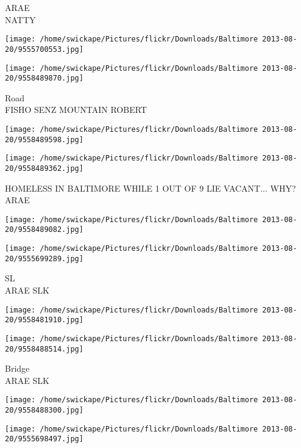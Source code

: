 \documentclass[10pt,letterpaper]{article}
\begin{document}
ARAE\\
NATTY\\
\pagebreak

\texttt{[image: /home/swickape/Pictures/flickr/Downloads/Baltimore 2013-08-20/9555700553.jpg]}

\vspace{0.25in}
\texttt{[image: /home/swickape/Pictures/flickr/Downloads/Baltimore 2013-08-20/9558489870.jpg]}

Road\\
FISHO SENZ MOUNTAIN ROBERT\\
\pagebreak

\texttt{[image: /home/swickape/Pictures/flickr/Downloads/Baltimore 2013-08-20/9558489598.jpg]}

\vspace{0.25in}
\texttt{[image: /home/swickape/Pictures/flickr/Downloads/Baltimore 2013-08-20/9558489362.jpg]}

HOMELESS IN BALTIMORE WHILE 1 OUT OF 9 LIE VACANT... WHY?\\
ARAE\\
\pagebreak

\texttt{[image: /home/swickape/Pictures/flickr/Downloads/Baltimore 2013-08-20/9558489082.jpg]}

\vspace{0.25in}
\texttt{[image: /home/swickape/Pictures/flickr/Downloads/Baltimore 2013-08-20/9555699289.jpg]}

SL\\
ARAE SLK\\
\pagebreak

\texttt{[image: /home/swickape/Pictures/flickr/Downloads/Baltimore 2013-08-20/9558481910.jpg]}

\vspace{0.25in}
\texttt{[image: /home/swickape/Pictures/flickr/Downloads/Baltimore 2013-08-20/9558488514.jpg]}

Bridge\\
ARAE SLK\\
\pagebreak

\texttt{[image: /home/swickape/Pictures/flickr/Downloads/Baltimore 2013-08-20/9558488300.jpg]}

\vspace{0.25in}
\texttt{[image: /home/swickape/Pictures/flickr/Downloads/Baltimore 2013-08-20/9555698497.jpg]}
\end{document}
